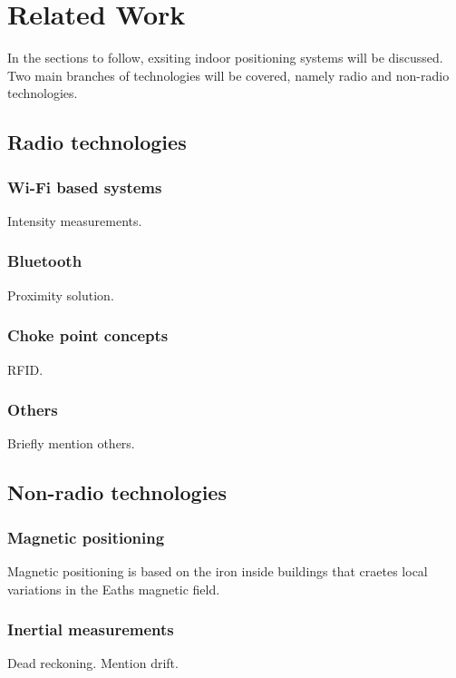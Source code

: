 \section{Related Work}
In the sections to follow, exsiting indoor positioning systems will be discussed. Two main branches of technologies will be covered, namely radio and non-radio technologies.

\subsection{Radio technologies}
\subsubsection{Wi-Fi based systems}
Intensity measurements.
\cite{Test}

\subsubsection{Bluetooth}
Proximity solution.

\subsubsection{Choke point concepts}
RFID.

\subsubsection{Others}
Briefly mention others.

\subsection{Non-radio technologies}
\subsubsection{Magnetic positioning}
Magnetic positioning is based on the iron inside buildings that craetes local variations in the Eaths magnetic field.

\subsubsection{Inertial measurements}
Dead reckoning. Mention drift.

